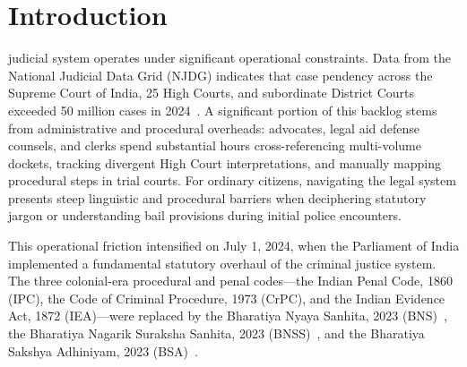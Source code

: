 \documentclass[conference]{IEEEtran}
\begin{document}
\section{Introduction}
 judicial system operates under significant operational constraints. Data from the National Judicial Data Grid (NJDG) indicates that case pendency across the Supreme Court of India, 25 High Courts, and subordinate District Courts exceeded 50 million cases in 2024~\cite{njdg2024}. A significant portion of this backlog stems from administrative and procedural overheads: advocates, legal aid defense counsels, and clerks spend substantial hours cross-referencing multi-volume dockets, tracking divergent High Court interpretations, and manually mapping procedural steps in trial courts. For ordinary citizens, navigating the legal system presents steep linguistic and procedural barriers when deciphering statutory jargon or understanding bail provisions during initial police encounters.

This operational friction intensified on July 1, 2024, when the Parliament of India implemented a fundamental statutory overhaul of the criminal justice system. The three colonial-era procedural and penal codes---the Indian Penal Code, 1860 (IPC), the Code of Criminal Procedure, 1973 (CrPC), and the Indian Evidence Act, 1872 (IEA)---were replaced by the Bharatiya Nyaya Sanhita, 2023 (BNS)~\cite{bns2023}, the Bharatiya Nagarik Suraksha Sanhita, 2023 (BNSS)~\cite{bnss2023}, and the Bharatiya Sakshya Adhiniyam, 2023 (BSA)~\cite{bsa2023}. 
\end{document}
